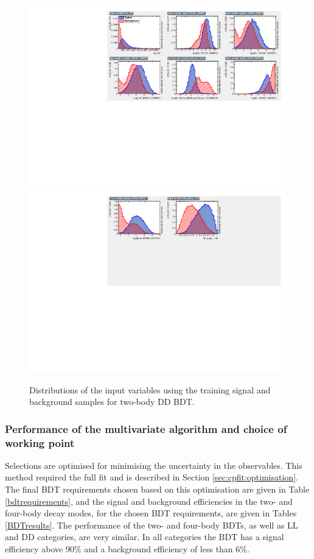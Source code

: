 \begin{figure}
\centering
\includegraphics[width=\linewidth]{figures/selection/inputvariables_KPi_DD_run1_1.pdf}
\includegraphics[trim = 0mm 50mm 0mm 0mm, clip,width=\linewidth]{figures/selection/inputvariables_KPi_DD_run1_2.pdf}
\caption{Distributions of the input variables using the training signal and background samples for two-body DD BDT.}
\label{BDTinputdist2bodyDD}
\end{figure}

\subsubsection{Performance of the multivariate algorithm and choice of working point}

Selections are optimised for minimising the uncertainty in the \CP observables. This method required the full fit and is described in Section \ref{sec:cpfit:optimisation}. The final BDT requirements chosen based on this optimisation are given in Table \ref{bdtrequirements}, and the signal and background efficiencies in the two- and four-body \Dz decay modes, for the chosen BDT requirements, are given in Tables \ref{BDTresults}. The performance of the two- and four-body BDTs, as well as LL and DD categories, are very similar. In all categories the BDT has a signal efficiency above 90\% and a background efficiency of less than 6\%. 

